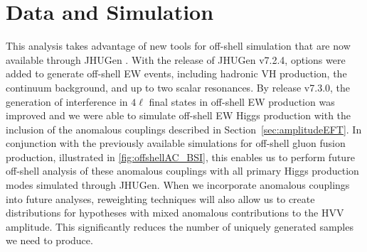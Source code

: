 



\section{Data and Simulation}


This analysis takes advantage of new tools for off-shell simulation that are now available through JHUGen \cite{2010,2012,2014,2016,2020,2021}. With the release of JHUGen v7.2.4, options were added to generate off-shell EW events, including hadronic VH production, the continuum background, and up to two scalar resonances. By release v7.3.0, the generation of interference in $4\ell$ final states in off-shell EW production was improved and we were able to simulate off-shell EW Higgs production with the inclusion of the anomalous couplings described in Section~\ref{sec:amplitudeEFT}. In conjunction with the previously available simulations for off-shell gluon fusion production, illustrated in \ref{fig:offshellAC_BSI}, this enables us to perform future off-shell analysis of these anomalous couplings with all primary Higgs production modes simulated through JHUGen. When we incorporate anomalous couplings into future analyses, reweighting techniques will also allow us to create distributions for hypotheses with mixed anomalous contributions to the HVV amplitude. This significantly reduces the number of uniquely generated samples we need to produce. 

